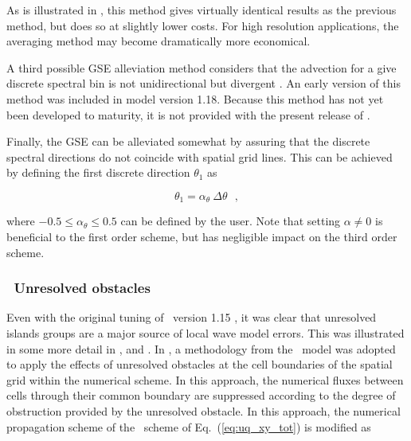 As is illustrated in \cite{tol:OMOD02b,tol:OMB02b}, this method gives
virtually identical results as the previous method, but does so at slightly
lower costs. For high resolution applications, the averaging method may become
dramatically more economical.

A third possible GSE alleviation method considers that the advection for a
give discrete spectral bin is not unidirectional but divergent
\citep[see][]{tol:OMOD02b}.  An early version of this method was included in
model version 1.18. Because this method has not yet been developed to
maturity, it is not provided with the present release of \ws.

Finally, the GSE can be alleviated somewhat by assuring that the discrete
spectral directions do not coincide with spatial grid lines. This can be
achieved by defining the first discrete direction $\theta_1$ as


\begin{equation}
\theta_1 = \alpha_\theta \: \Delta \theta \:\:\: , \label{eq:theta1}
\end{equation}

\noindent
where $-0.5 \leq \alpha_\theta \leq 0.5$ can be defined by the user. Note that
setting $\alpha \neq 0$ is beneficial to the first order scheme, but has
negligible impact on the third order scheme.
 


\vsssub
\subsubsection{~Unresolved obstacles} \label{sec_obst}
\vsssub

Even with the original tuning of \ws\ version 1.15 \citep{tol:OMB02a}, it was
clear that unresolved islands groups are a major source of local wave model
errors. This was illustrated in some more detail in
\citet[][Fig.~3]{tol:Waves01a}, and \citet[][Fig.~8]{tol:WaF02}. In \ws, a
methodology from the \swan\ model \citep{art:BRH99,man:SWAN3} was adopted to
apply the effects of unresolved obstacles at the cell boundaries of the
spatial grid within the numerical scheme. In this approach, the numerical
fluxes between cells through their common boundary are suppressed according to
the degree of obstruction provided by the unresolved obstacle. In this
approach, the numerical propagation scheme of the \uq\ scheme of
Eq.~(\ref{eq:uq_xy_tot}) is modified as

